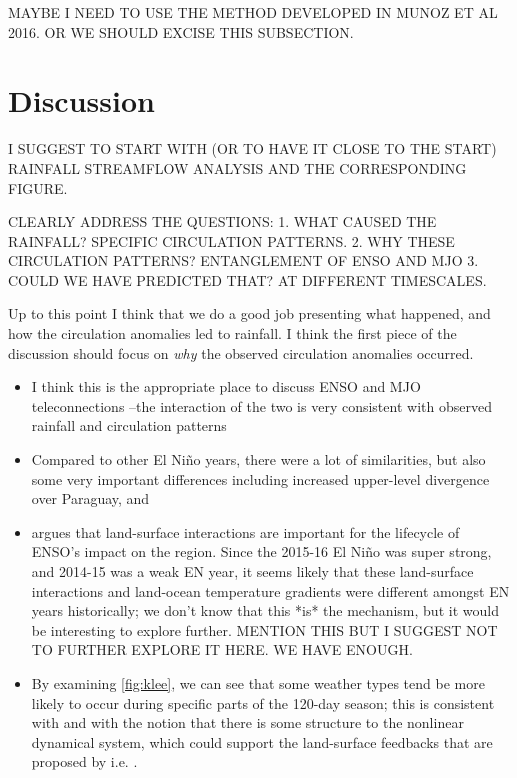 \documentclass[twocol]{ametsoc}
\begin{document}
MAYBE I NEED TO USE THE METHOD DEVELOPED IN MUNOZ ET AL 2016. OR WE SHOULD EXCISE THIS SUBSECTION.

\section{Discussion}
\label{sec:discussion}

I SUGGEST TO START WITH (OR TO HAVE IT CLOSE TO THE START) RAINFALL STREAMFLOW ANALYSIS AND THE CORRESPONDING FIGURE.

CLEARLY ADDRESS THE QUESTIONS:
1. WHAT CAUSED THE RAINFALL? SPECIFIC CIRCULATION PATTERNS.
2. WHY THESE CIRCULATION PATTERNS? ENTANGLEMENT OF ENSO AND MJO
3. COULD WE HAVE PREDICTED THAT? AT DIFFERENT TIMESCALES.

Up to this point I think that we do a good job presenting what happened, and how the circulation anomalies led to rainfall.
I think the first piece of the discussion should focus on \emph{why} the observed circulation anomalies occurred.
\begin{itemize}
	\item I think this is the appropriate place to discuss ENSO and MJO teleconnections --the interaction of the two is very consistent with observed rainfall and circulation patterns
	\item Compared to other El Ni\~{n}o years, there were a lot of similarities, but also some very important differences including increased upper-level divergence over Paraguay, and
	\item \citet{Grimm2009} argues that land-surface interactions are important for the lifecycle of ENSO's impact on the region.
	Since the 2015-16 El Ni\~no was super strong, and 2014-15 was a weak EN year, it seems likely that these land-surface interactions and land-ocean temperature gradients were different amongst EN years historically; we don't know that this *is* the mechanism, but it would be interesting to explore further. MENTION THIS BUT I SUGGEST NOT TO FURTHER EXPLORE IT HERE. WE HAVE ENOUGH.
	\item By examining \cref{fig:klee}, we can see that some weather types tend be more likely to occur during specific parts of the 120-day season; this is consistent with \citet{Munoz2016} and with the notion that there is some structure to the nonlinear dynamical system, which could support the land-surface feedbacks that are proposed by i.e. \citep{Grimm:2009bq}.
\end{itemize}
\end{document}
